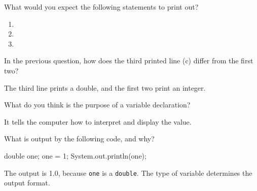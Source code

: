 \Q What would you expect the following statements to print out?

\begin{enumerate}
\item {} 
\item {} 
\item {} 
\end{enumerate}


\Q In the previous question, how does the third printed line (c) differ from the first two?

\begin{answer}
The third line prints a double, and the first two print an integer.
\end{answer}


\Q \label{vardecl}
What do you think is the purpose of a variable declaration?

\begin{answer}
It tells the computer how to interpret and display the value.
\end{answer}


\Q What is output by the following code, and why?

\begin{minipage}[t]{0.33\linewidth}

\vspace{-2ex}
\begin{javalst}
double one;
one = 1;
System.out.println(one);
\end{javalst}

\end{minipage}
\hfill
\begin{minipage}[t]{0.66\linewidth}

\begin{answer}
The output is 1.0, because {\tt one} is a {\tt double}.
The type of variable determines the output format.
\end{answer}

\end{minipage}
